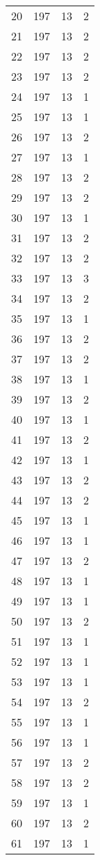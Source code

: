\begin{longtable}[!]{c|ccc}
	20	& 197	& 13	& 2	\\
	21	& 197	& 13	& 2	\\
	22	& 197	& 13	& 2	\\
	23	& 197	& 13	& 2	\\
	24	& 197	& 13	& 1	\\
	25	& 197	& 13	& 1	\\
	26	& 197	& 13	& 2	\\
	27	& 197	& 13	& 1	\\
	28	& 197	& 13	& 2	\\
	29	& 197	& 13	& 2	\\
	30	& 197	& 13	& 1	\\
	31	& 197	& 13	& 2	\\
	32	& 197	& 13	& 2	\\
	33	& 197	& 13	& 3	\\
	34	& 197	& 13	& 2	\\
	35	& 197	& 13	& 1	\\
	36	& 197	& 13	& 2	\\
	37	& 197	& 13	& 2	\\
	38	& 197	& 13	& 1	\\
	39	& 197	& 13	& 2	\\
	40	& 197	& 13	& 1	\\
	41	& 197	& 13	& 2	\\
	42	& 197	& 13	& 1	\\
	43	& 197	& 13	& 2	\\
	44	& 197	& 13	& 2	\\
	45	& 197	& 13	& 1	\\
	46	& 197	& 13	& 1	\\
	47	& 197	& 13	& 2	\\
	48	& 197	& 13	& 1	\\
	49	& 197	& 13	& 1	\\
	50	& 197	& 13	& 2	\\
	51	& 197	& 13	& 1	\\
	52	& 197	& 13	& 1	\\
	53	& 197	& 13	& 1	\\
	54	& 197	& 13	& 2	\\
	55	& 197	& 13	& 1	\\
	56	& 197	& 13	& 1	\\
	57	& 197	& 13	& 2	\\
	58	& 197	& 13	& 2	\\
	59	& 197	& 13	& 1	\\
	60	& 197	& 13	& 2	\\
	61	& 197	& 13	& 1	\\

\end{longtable}

